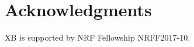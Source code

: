 \documentclass[letterpaper]{article} %
\begin{document}






\section*{Acknowledgments}
XB is supported by NRF Fellowship NRFF2017-10.
\end{document}
